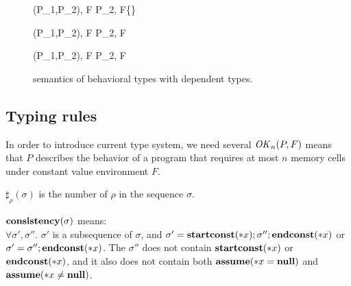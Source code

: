\begin{figure}
\begin{minipage}{\textwidth}
{ \langle \Sirx (P_1,P_2), F \rangle \rightarrow \langle P_2, F\cup\{\snnull\} \rangle }

{ \langle \Sirx (P_1,P_2), F \rangle \rightarrow \langle P_2, F \rangle }

{ \langle \Sirx (P_1,P_2), F \rangle \rightarrow \langle P_2, F \rangle }

 



\end{minipage}
\caption{semantics of behavioral types with dependent types.}
\label{fig:bdRules}
\end{figure}

\subsection{Typing rules}

In order to introduce current type system, we need several
\(\mathit{OK}_n(P,F)\) means that \(P\) describes the behavior of a program
that requires at most \(n\) memory cells under constant value
environment \(F\).

\begin{myDef}[\(\sharp_{\rho}(\sigma)\)]
\label{df:sharf}
\(\sharp_{\rho}(\sigma)\) is the number of \(\rho\) in the sequence
\(\sigma\).
\end{myDef}

\begin{myDef}
\label{df:const}
\(\mathbf{consistency}(\sigma)\) means:\\
\( \forall \sigma',\sigma''\). \(\sigma'\) is a subsequence
of \(\sigma\), and \(\sigma' = \mathbf{startconst}(*x);\sigma'';\mathbf{endconst}(*x)\) or \(\sigma' = \sigma'';\mathbf{endconst}(*x)\). The \(\sigma''\) does not contain \(\mathbf{startconst}(*x)\) or \(\mathbf{endconst}(*x) \), and it also does not contain both \(\mathbf{assume}(*x = \mathbf{null})\) and \(\mathbf{assume}(*x \ne \mathbf{null})\).
\end{myDef}


